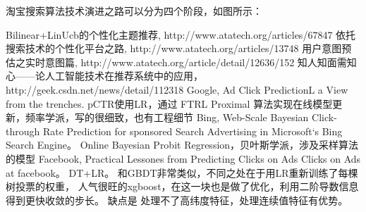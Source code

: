 淘宝搜索算法技术演进之路可以分为四个阶段，如图所示： 


\begin{thebibliography}{99}
 Bilinear+LinUcb的个性化主题推荐, http://www.atatech.org/articles/67847
 依托搜索技术的个性化平台之路, http://www.atatech.org/articles/13748
 用户意图预估之实时意图篇, http://www.atatech.org/article/detail/12636/152
 知人知面需知心——论人工智能技术在推荐系统中的应用，http://geek.csdn.net/news/detail/112318
 Google, Ad Click PredictionL a View from the trenches. pCTR使用LR，通过
FTRL Proximal 算法实现在线模型更新，频率学派，写的很细致，也有工程细节
 Bing, Web-Scale Bayesian Click-through Rate Prediction for sponsored 
Search Advertising in Microsoft‘s Bing Search Engine。 Online Bayesian Probit Regression，贝叶斯学派，涉及采样算法的模型
 Facebook, Practical Lessones from Predicting Clicks on Ads Clicks 
on Ads at facebook。 DT+LR。 和GBDT非常类似，不同之处在于用LR重新训练了每棵树投票的权重，
人气很旺的xgboost，在这一块也是做了优化，利用二阶导数信息得到更快收敛的步长。 缺点是
处理不了高纬度特征，处理连续值特征有优势。


\end{thebibliography}

 
